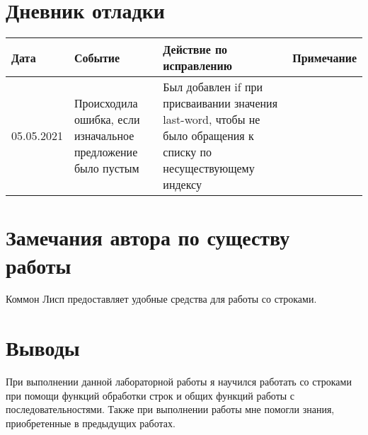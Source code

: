 \documentclass[12pt]{article}
\begin{document}
\section{Дневник отладки}
\begin{tabular}{|m{2cm}|m{6cm}|m{4cm}|m{3cm}|}
\hline
Дата & Событие & Действие по исправлению & Примечание \\
\hline
05.05.2021 & Происходила ошибка, если изначальное предложение было пустым & Был добавлен if при присваивании значения last-word, чтобы не было обращения к списку по несуществующему индексу & \\
\hline
\end{tabular}

\section{Замечания автора по существу работы}
Коммон Лисп предоставляет удобные средства для работы со строками.

\section{Выводы}
При выполнении данной лабораторной работы я научился работать со строками при помощи функций обработки строк и общих функций работы с последовательностями. Также при выполнении работы мне помогли знания, приобретенные в предыдущих работах.
\end{document}
